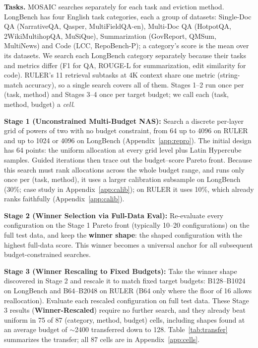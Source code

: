 \documentclass[11pt]{article}
\begin{document}
\textbf{Tasks.}\label{sec:method-tasks} MOSAIC searches separately for each task and eviction method. LongBench has four English task categories, each a group of datasets: Single-Doc QA (NarrativeQA, Qasper, MultiFieldQA-en), Multi-Doc QA (HotpotQA, 2WikiMultihopQA, MuSiQue), Summarization (GovReport, QMSum, MultiNews) and Code (LCC, RepoBench-P); a category's score is the mean over its datasets. We search each LongBench category separately because their tasks and metrics differ (F1 for QA, ROUGE-L for summarization, edit similarity for code). RULER's 11 retrieval subtasks at 4K context share one metric (string-match accuracy), so a single search covers all of them. Stages 1--2 run once per (task, method) and Stages 3--4 once per target budget; we call each (task, method, budget) a \emph{cell}.

\textbf{Stage 1 (Unconstrained Multi-Budget NAS):} Search a discrete per-layer grid of powers of two with no budget constraint, from 64 up to 4096 on RULER and up to 1024 or 4096 on LongBench (Appendix~\ref{app:repro}). The initial design has 64 points: the uniform allocation at every grid level plus Latin Hypercube samples. Guided iterations then trace out the budget--score Pareto front. Because this search must rank allocations across the whole budget range, and runs only once per (task, method), it uses a larger calibration subsample on LongBench (30\%; case study in Appendix~\ref{app:calib}); on RULER it uses 10\%, which already ranks faithfully (Appendix~\ref{app:calib}).

\textbf{Stage 2 (Winner Selection via Full-Data Eval):} Re-evaluate every configuration on the Stage 1 Pareto front (typically 10--20 configurations) on the full test data, and keep the \textbf{winner shape}: the shaped configuration with the highest full-data score. This winner becomes a universal anchor for all subsequent budget-constrained searches.



\textbf{Stage 3 (Winner Rescaling to Fixed Budgets):} Take the winner shape discovered in Stage 2 and rescale it to match fixed target budgets: B128--B1024 on LongBench and B64--B2048 on RULER (B64 only where the floor of 16 allows reallocation). Evaluate each rescaled configuration on full test data. These Stage 3 results (\textbf{Winner-Rescaled}) require no further search, and they already beat uniform in 75 of 87 (category, method, budget) cells, including shapes found at an average budget of $\sim$2400 transferred down to 128. Table~\ref{tab:transfer} summarizes the transfer; all 87 cells are in Appendix~\ref{app:cells}.
\end{document}
